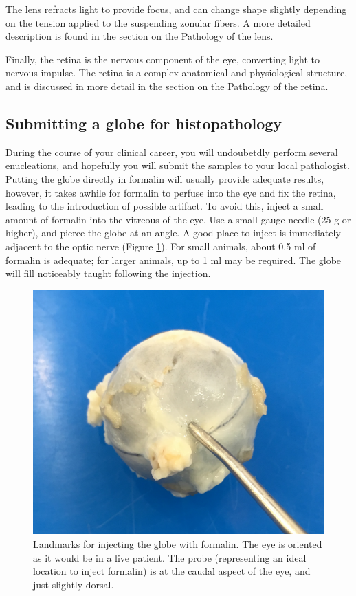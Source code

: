 \documentclass[
  openany]{article}
\begin{document}
The lens refracts light to provide focus, and can change shape slightly depending on the tension applied to the suspending zonular fibers. A more detailed description is found in the section on the \protect\hyperlink{pathology-of-the-lens}{Pathology of the lens}.

Finally, the retina is the nervous component of the eye, converting light to nervous impulse. The retina is a complex anatomical and physiological structure, and is discussed in more detail in the section on the \protect\hyperlink{pathology-of-the-retina}{Pathology of the retina}.

\hypertarget{submitting-a-globe-for-histopathology}{%
\subsection{Submitting a globe for histopathology}\label{submitting-a-globe-for-histopathology}}

During the course of your clinical career, you will undoubetdly perform several enucleations, and hopefully you will submit the samples to your local pathologist. Putting the globe directly in formalin will usually provide adequate results, however, it takes awhile for formalin to perfuse into the eye and fix the retina, leading to the introduction of possible artifact. To avoid this, inject a small amount of formalin into the vitreous of the eye. Use a small gauge needle (25 g or higher), and pierce the globe at an angle. A good place to inject is immediately adjacent to the optic nerve (Figure \ref{fig:globe-biopsy}). For small animals, about 0.5 ml of formalin is adequate; for larger animals, up to 1 ml may be required. The globe will fill noticeably taught following the injection.

\begin{figure}

{\centering \includegraphics[width=0.6\linewidth]{images/globe-biopsy} 

}

\caption{Landmarks for injecting the globe with formalin. The eye is oriented as it would be in a live patient. The probe (representing an ideal location to inject formalin) is at the caudal aspect of the eye, and just slightly dorsal.}\label{fig:globe-biopsy}
\end{figure}
\end{document}
